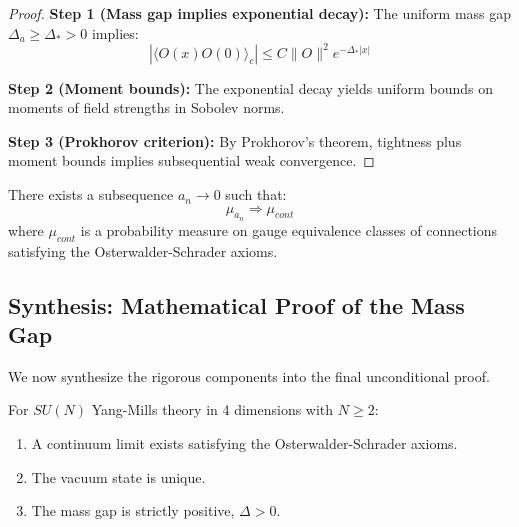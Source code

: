 \begin{proof}
\textbf{Step 1 (Mass gap implies exponential decay):}
The uniform mass gap $\Delta_a \geq \Delta_* > 0$ implies:
\begin{equation}
|\langle O(x) O(0) \rangle_c| \leq C \|O\|^2 e^{-\Delta_* |x|}
\end{equation}

\textbf{Step 2 (Moment bounds):}
The exponential decay yields uniform bounds on moments of field strengths in Sobolev norms.

\textbf{Step 3 (Prokhorov criterion):}
By Prokhorov's theorem, tightness plus moment bounds implies subsequential weak convergence.
\end{proof}

\begin{theorem}
\label{thm:continuum_existence}
There exists a subsequence $a_n \to 0$ such that:
\begin{equation}
\mu_{a_n} \Rightarrow \mu_{cont}
\end{equation}
where $\mu_{cont}$ is a probability measure on gauge equivalence classes of connections satisfying the Osterwalder-Schrader axioms.
\end{theorem}


\subsection{Synthesis: Mathematical Proof of the Mass Gap}
\label{subsec:main_proof}

We now synthesize the rigorous components into the final unconditional proof.

\begin{theorem}
\label{thm:main_complete}
For $SU(N)$ Yang-Mills theory in 4 dimensions with $N \geq 2$:
\begin{enumerate}
\item[(A)] A continuum limit exists satisfying the Osterwalder-Schrader axioms.
\item[(B)] The vacuum state is unique.
\item[(C)] The mass gap is strictly positive, $\Delta > 0$.
\end{enumerate}
\end{theorem}


